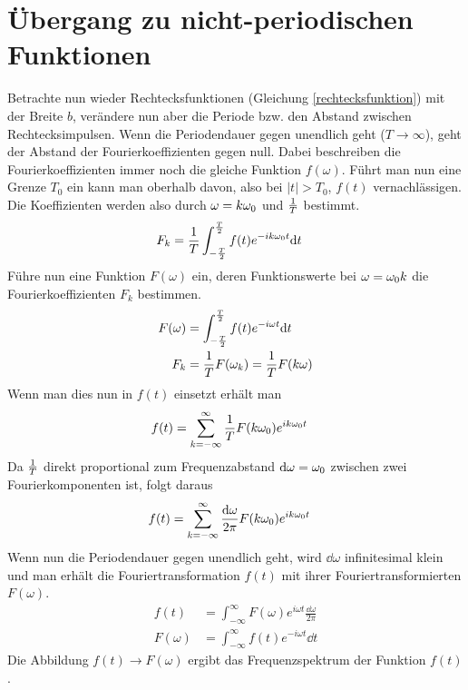 \section[Übergang zu nicht-periodischen Funktionen]%
{Übergang zu nicht-periodischen Funktionen}
Betrachte nun wieder Rechtecksfunktionen (Gleichung
\eqref{rechtecksfunktion}) mit der Breite $b$, 
verändere nun aber die Periode bzw. den Abstand zwischen
Rechtecksimpulsen.
Wenn die Periodendauer gegen unendlich geht
($T\longrightarrow\infty$), geht der Abstand der Fourierkoeffizienten
gegen null. Dabei beschreiben die Fourierkoeffizienten immer noch die
gleiche Funktion $f(\omega)$. Führt man nun eine Grenze $T_0$ ein kann
man oberhalb davon, also bei $\vert t\vert >T_0$, $f(t)$
vernachlässigen. Die Koeffizienten werden also durch $\omega=k\omega_0$
und $\frac{1}{T}$ bestimmt. 
\begin{align*}
  F_k &= \frac{1}{T} \int_{-\frac{T}{2}}^{\frac{T}{2}} 
        f(t) e^{-ik\omega_0 t}\mathrm{d} t
\end{align*}
Führe nun eine Funktion $F(\omega)$ ein, deren Funktionswerte bei
$\omega=\omega_0 k$ die Fourierkoeffizienten $F_k$ bestimmen.
\begin{align*}
  F(\omega) &= \int_{-\frac{T}{2}}^{\frac{T}{2}}
              f(t)e^{-i\omega t}\mathrm{d} t\\
  F_k &= \frac{1}{T} F(\omega_k)        
        =\frac{1}{T}F(k\omega)
\end{align*}
Wenn man dies nun in $f(t)$ einsetzt erhält man
\begin{align*}
  f(t) &= \sum_{k=-\infty}^{\infty}
         \frac{1}{T} F(k\omega_0)e^{ik\omega_0 t}
\end{align*}
Da $\frac{1}{T}$ direkt proportional zum Frequenzabstand 
$\mathrm{d}\omega=\omega_0$ zwischen zwei Fourierkomponenten ist, folgt daraus
\begin{align*}
  f(t) &= \sum_{k=-\infty}^{\infty}
         \frac{\mathrm{d} \omega}{2\pi} F(k\omega_0) e^{ik\omega_0 t}
\end{align*}
Wenn nun die Periodendauer gegen unendlich geht, 
wird $\dd \omega$ infinitesimal klein und man erhält die
Fouriertransformation $f(t)$ mit ihrer Fouriertransformierten
$F(\omega)$.
\begin{align*}
  f(t) &= \int_{-\infty}^{\infty} 
         F(\omega)e^{i\omega t}\frac{\dd\omega}{2\pi}\\
  F(\omega) &= \int_{-\infty}^{\infty} 
              f(t)e^{-i\omega t}\dd t
\end{align*}
Die Abbildung $f(t)\longrightarrow F(\omega)$ ergibt das
Frequenzspektrum der Funktion $f(t)$.

